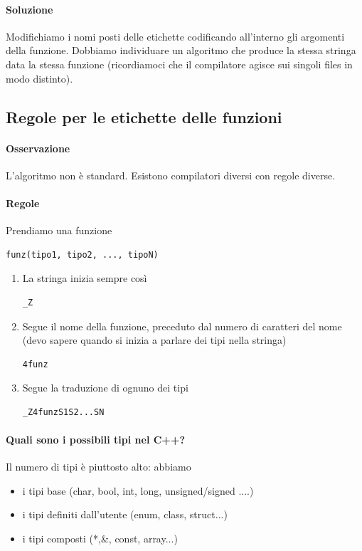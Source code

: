 \documentclass[11pt]{report}
\theoremstyle{definition}
\begin{document}
\paragraph{Soluzione}  Modifichiamo i nomi posti delle etichette codificando all'interno gli argomenti della funzione. Dobbiamo individuare un algoritmo che produce la stessa stringa data la stessa funzione (ricordiamoci che il compilatore agisce sui singoli files in modo distinto).

\subsection{Regole per le etichette delle funzioni}
\paragraph{Osservazione} L'algoritmo non è standard. Esistono compilatori diversi con regole diverse.
\paragraph{Regole} Prendiamo una funzione
\begin{verbatim}
funz(tipo1, tipo2, ..., tipoN)
\end{verbatim}
\begin{enumerate}
\item La stringa inizia sempre così
\begin{verbatim}
_Z
\end{verbatim}
\item Segue il nome della funzione, preceduto dal numero di caratteri del nome (devo sapere quando si inizia a parlare dei tipi nella stringa)
\begin{verbatim}
4funz
\end{verbatim}
\item Segue la traduzione di ognuno dei tipi
\begin{verbatim}
_Z4funzS1S2...SN
\end{verbatim}
\end{enumerate}
\paragraph{Quali sono i possibili tipi nel C++?} Il numero di tipi è piuttosto alto: abbiamo 
\begin{itemize}
\item i tipi base (char, bool, int, long, unsigned/signed ....)
\item i tipi definiti dall'utente (enum, class, struct...)
\item i tipi composti (*,\&, const, array...)
\end{itemize}
\end{document}
